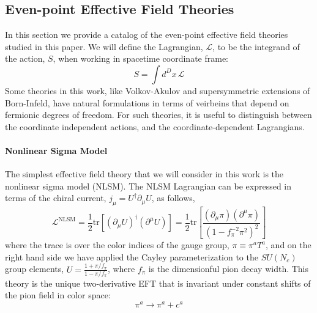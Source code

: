 \documentclass[11pt,letter]{article}
\def\dj#1{{\color{NUpurple}\it \bf JJ: #1}}
\begin{document}
\subsection{Even-point Effective Field Theories}
\label{subsec:EPEFTReview}
\iffalse
 provide some background on the even-point effective field theories that we study in detail in this paper. Typically the power of effective field theory is in its ability to parameterize our ignorance of  hidden UV dynamics in, {a priori}, unconstrained Wilson coefficients -- constrained by comparison to data in either the UV theory or experimental measurement. Throughout the text we will focus on theories whose Wilson coefficients are dictated by symmetry. \dj{This sentence is a little wierd -- usually you think of EFTs as writing down all operators consistent with the symmetries of the physics you're interested in. }  


In what follows, we
\fi
In this section we provide a catalog of the even-point effective field theories studied in this paper. We will define the Lagrangian, $\mathcal{L}$, to be the integrand of the action, $S$, when working in spacetime coordinate frame:
\begin{equation}
S= \int d^D x \,\mathcal{L}
\end{equation}
Some theories in this work, like Volkov-Akulov and supersymmetric extensions of Born-Infeld, have natural formulations in terms of veirbeins that depend on fermionic degrees of freedom. For such theories, it is useful to distinguish between the coordinate independent actions, and the coordinate-dependent Lagrangians. 
\paragraph{Nonlinear Sigma Model}
The simplest effective field theory that we will consider in this work is the {nonlinear sigma model} (NLSM). The NLSM Lagrangian can be expressed in terms of the chiral current, $j_\mu = U^\dagger \partial_\mu U$, as follows,
\begin{equation}\label{eq:NLSMLag}
\mathcal{L}^{\text{NLSM}}= \frac{1}{2}\text{tr}[(\partial_\mu U)^\dagger (\partial ^\mu U)] = \frac{1}{2}\text{tr}\left[\frac{(\partial_\mu\pi )( \partial^\mu \pi) }{(1-f_\pi^{-2}\pi^2)^2}\right]
\end{equation}
where the trace is over the color indices of the gauge group, $\pi \equiv \pi^a T^a$, and on the right hand side we have applied the Cayley parameterization to the $SU(N_c)$ group elements, $U= \frac{1+\pi/f_\pi}{1-\pi/f_\pi}$, where $f_\pi$ is the dimensionful pion decay width. This theory is the unique two-derivative EFT that is invariant under constant shifts of the pion field in color space:
\begin{equation}\label{eq:shiftSym}
\pi^a \rightarrow \pi^a + c^a
\end{equation}
\end{document}
